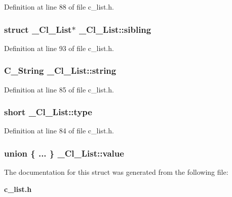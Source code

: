Definition at line 88 of file c\_\-list.h.
\subsubsection{\setlength{\rightskip}{0pt plus 5cm}struct \bf{\_\-Cl\_\-List}$\ast$ \bf{\_\-Cl\_\-List::sibling}}\label{struct__Cl__List_d6460562d3210e0de4257d9d62500879}




Definition at line 93 of file c\_\-list.h.
\subsubsection{\setlength{\rightskip}{0pt plus 5cm}\bf{C\_\-String} \bf{\_\-Cl\_\-List::string}}\label{struct__Cl__List_43a1077a7d99d44257527adb2f25c9f9}




Definition at line 85 of file c\_\-list.h.
\subsubsection{\setlength{\rightskip}{0pt plus 5cm}short \bf{\_\-Cl\_\-List::type}}\label{struct__Cl__List_65b9acb50c878de91c6848bec2940ab4}




Definition at line 84 of file c\_\-list.h.
\subsubsection{\setlength{\rightskip}{0pt plus 5cm}union \{ ... \} 
   \bf{\_\-Cl\_\-List::value}}\label{struct__Cl__List_9c78d021db868ca6fe2d9488423e1d4b}




The documentation for this struct was generated from the following file:\begin{CompactItemize}
\item 
\bf{c\_\-list.h}\end{CompactItemize}
